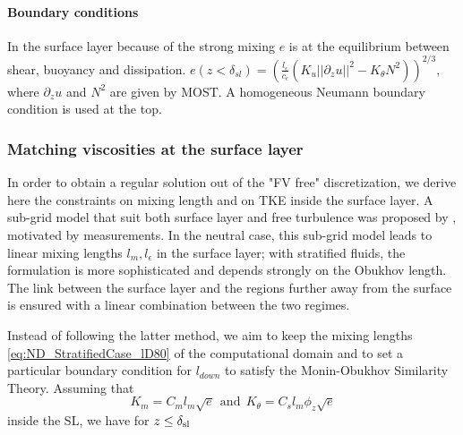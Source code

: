 \paragraph{Boundary conditions}
In the surface layer because of the strong mixing $e$
is at the equilibrium between shear, buoyancy and dissipation.
$e(z<\delta_{sl}) = \left(\frac{l_\epsilon}{c_\epsilon}
(K_u||\partial_z u||^2 - K_\theta N^2)\right)^{2/3}$, where
$\partial_z u$ and $N^2$ are given by MOST.
A homogeneous Neumann boundary condition is used at the top.

\subsubsection{Matching viscosities at the surface layer}
\label{sec:ND_StratifiedCase_mixing_lengths_match}
In order to obtain a regular solution out of the "FV free"
discretization, we derive here the constraints on mixing length
and on TKE inside the surface layer.
A sub-grid model that suit both
surface layer and free turbulence was proposed by
\citep{redelsperger_simple_2001}, motivated by measurements.
In the neutral case, this sub-grid model leads to linear
mixing lengths $l_m, l_{\epsilon}$ in the surface layer;
with stratified fluids, the formulation is more sophisticated
and depends strongly on the Obukhov length.
The link between the surface layer and the regions
further away from the surface is ensured with a linear combination
between the two regimes.
%
\par
Instead of following the latter method,
we aim to keep the mixing lengths \eqref{eq:ND_StratifiedCase_lD80}
of the computational domain and
to set a particular boundary condition for $l_{down}$
to satisfy the Monin-Obukhov Similarity Theory.
Assuming that 
\begin{equation}
	\label{eq:ND_StratifiedCase_viscosities_assumption}
K_m = C_m l_m \sqrt{e} ~~\text{and}~~
K_\theta = C_s l_m \phi_z \sqrt{e}
\end{equation}
 inside the SL, we have
for $z\leq \delta_{\rm sl}$
